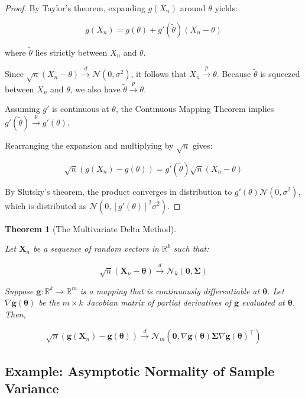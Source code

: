 \documentclass[
  letterpaper,
  DIV=11,
  numbers=noendperiod]{scrreprt}
\renewcommand{\[}{\begin{equation}}
\renewcommand{\]}{\end{equation}}
\theoremstyle{definition}
\theoremstyle{plain}
\theoremstyle{plain}
\theoremstyle{plain}
\newtheorem{theorem}{Theorem}[chapter]
\theoremstyle{definition}
\theoremstyle{plain}
\theoremstyle{remark}
\begin{document}
\begin{proof}
By Taylor's theorem, expanding \(g(X_n)\) around \(\theta\) yields:

\[ 
g(X_n) = g(\theta) + g'(\tilde{\theta})(X_n - \theta) 
\]

where \(\tilde{\theta}\) lies strictly between \(X_n\) and \(\theta\).

Since
\(\sqrt{n}(X_n - \theta) \xrightarrow{d} \mathcal{N}(0, \sigma^2)\), it
follows that \(X_n \xrightarrow{p} \theta\). Because \(\tilde{\theta}\)
is squeezed between \(X_n\) and \(\theta\), we also have
\(\tilde{\theta} \xrightarrow{p} \theta\).

Assuming \(g'\) is continuous at \(\theta\), the Continuous Mapping
Theorem implies \(g'(\tilde{\theta}) \xrightarrow{p} g'(\theta)\).

Rearranging the expansion and multiplying by \(\sqrt{n}\) gives:

\[ 
\sqrt{n}(g(X_n) - g(\theta)) = g'(\tilde{\theta}) \sqrt{n}(X_n - \theta) 
\]

By Slutsky's theorem, the product converges in distribution to
\(g'(\theta) \mathcal{N}(0, \sigma^2)\), which is distributed as
\(\mathcal{N}(0, [g'(\theta)]^2 \sigma^2)\).
\end{proof}

\begin{theorem}[The Multivariate Delta
Method]\protect\hypertarget{thm-multivariate-delta-method}{}\label{thm-multivariate-delta-method}

Let \(\mathbf{X}_n\) be a sequence of random vectors in \(\mathbb{R}^k\)
such that:

\[ 
\sqrt{n}(\mathbf{X}_n - \boldsymbol{\theta}) \xrightarrow{d} \mathcal{N}_k(\mathbf{0}, \boldsymbol{\Sigma}) 
\]

Suppose \(\mathbf{g}: \mathbb{R}^k \rightarrow \mathbb{R}^m\) is a
mapping that is continuously differentiable at \(\boldsymbol{\theta}\).
Let \(\nabla \mathbf{g}(\boldsymbol{\theta})\) be the \(m \times k\)
Jacobian matrix of partial derivatives of \(\mathbf{g}\) evaluated at
\(\boldsymbol{\theta}\). Then,

\[ 
\sqrt{n}(\mathbf{g}(\mathbf{X}_n) - \mathbf{g}(\boldsymbol{\theta})) \xrightarrow{d} \mathcal{N}_m(\mathbf{0}, \nabla \mathbf{g}(\boldsymbol{\theta}) \boldsymbol{\Sigma} \nabla \mathbf{g}(\boldsymbol{\theta})^\top) 
\]

\end{theorem}

\subsection{Example: Asymptotic Normality of Sample
Variance}\label{example-asymptotic-normality-of-sample-variance}
\end{document}
